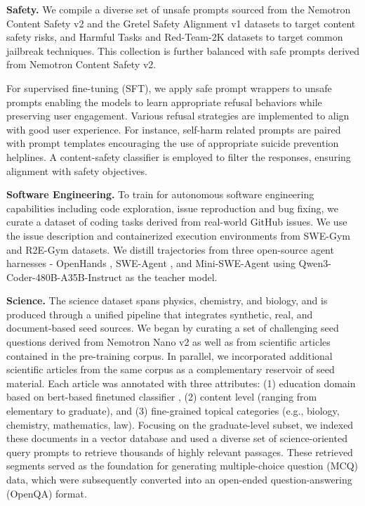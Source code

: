 \textbf{Safety.} 
We compile a diverse set of unsafe prompts sourced from the Nemotron Content Safety v2 \citep{ghosh-etal-2025-aegis2} and the Gretel Safety Alignment v1 \citep{gretelai_gretel-safety-alignment-en-v1}  datasets to target content safety risks, and Harmful Tasks \citep{hasan2024pruning} and Red-Team-2K \citep{luo2024jailbreakv_robustness} datasets to target common jailbreak techniques. This collection is further balanced with safe prompts derived from Nemotron Content Safety v2.

For supervised fine-tuning (SFT), we apply safe prompt wrappers to unsafe prompts enabling the models to learn appropriate refusal behaviors while preserving user engagement. Various refusal strategies are implemented to align with good user experience. For instance, self-harm related prompts are paired with prompt templates encouraging the use of appropriate suicide prevention helplines. A content-safety classifier is employed to filter the responses, ensuring alignment with safety objectives.




\textbf{Software Engineering.} To train \ourmodel for autonomous software engineering capabilities including code exploration, issue reproduction and bug fixing, we curate a dataset of coding tasks derived from real-world GitHub issues. We use the issue description and containerized execution environments from SWE-Gym \citep{pan2025trainingsoftwareengineeringagents} and R2E-Gym \citep{jain2025r2egymproceduralenvironmentshybrid} datasets. We distill trajectories from three open-source agent harnesses - OpenHands \citep{wang2025openhandsopenplatformai}, SWE-Agent \citep{yang2024sweagent}, and Mini-SWE-Agent \citep{yang2024sweagent} using Qwen3-Coder-480B-A35B-Instruct  \citep{qwen2025qwen25technicalreport} as the teacher model. 

\textbf{Science.} The science dataset spans physics, chemistry, and biology, and is produced through a unified pipeline that integrates synthetic, real, and document-based seed sources. We began by curating a set of challenging seed questions derived from Nemotron Nano v2 \citep{nemotronnanov2} as well as from scientific articles contained in the pre-training corpus. In parallel, we incorporated additional scientific articles from the same corpus as a complementary reservoir of seed material. Each article was annotated with three attributes: (1) education domain based on bert-based finetuned classifier \citep{li2024datacomp}, (2) content level (ranging from elementary to graduate), and (3) fine-grained topical categories (e.g., biology, chemistry, mathematics, law). Focusing on the graduate-level subset, we indexed these documents in a vector database and used a diverse set of science-oriented query prompts to retrieve thousands of highly relevant passages. These retrieved segments served as the foundation for generating multiple-choice question (MCQ) data, which were subsequently converted into an open-ended question-answering (OpenQA) format.

